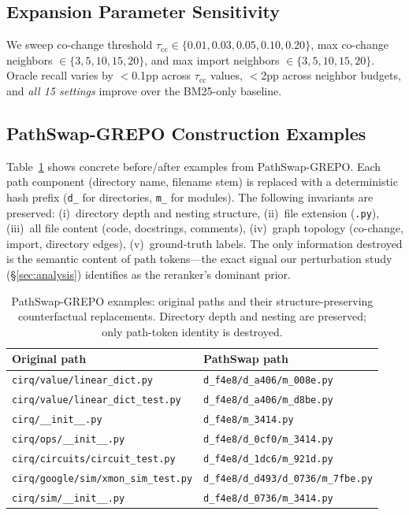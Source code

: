 \documentclass{article}
\begin{document}
\subsection{Expansion Parameter Sensitivity}
\label{app:sensitivity}

We sweep co-change threshold $\tau_\mathrm{cc} \in \{0.01, 0.03, 0.05, 0.10, 0.20\}$, max co-change neighbors $\in \{3, 5, 10, 15, 20\}$, and max import neighbors $\in \{3, 5, 10, 15, 20\}$.
Oracle recall varies by $<$0.1pp across $\tau_\mathrm{cc}$ values, $<$2pp across neighbor budgets, and \emph{all 15 settings} improve over the BM25-only baseline.


\subsection{PathSwap-GREPO Construction Examples}
\label{app:pathswap_examples}

Table~\ref{tab:pathswap_examples} shows concrete before/after examples from PathSwap-GREPO.
Each path component (directory name, filename stem) is replaced with a deterministic hash prefix (\texttt{d\_} for directories, \texttt{m\_} for modules).
The following invariants are preserved: (i)~directory depth and nesting structure, (ii)~file extension (\texttt{.py}), (iii)~all file content (code, docstrings, comments), (iv)~graph topology (co-change, import, directory edges), (v)~ground-truth labels.
The only information destroyed is the semantic content of path tokens---the exact signal our perturbation study (\S\ref{sec:analysis}) identifies as the reranker's dominant prior.

\begin{table}[h]
\centering
\caption{PathSwap-GREPO examples: original paths and their structure-preserving counterfactual replacements. Directory depth and nesting are preserved; only path-token identity is destroyed.}
\label{tab:pathswap_examples}
\small
\begin{tabular}{ll}
\toprule
\textbf{Original path} & \textbf{PathSwap path} \\
\midrule
\texttt{cirq/value/linear\_dict.py} & \texttt{d\_f4e8/d\_a406/m\_008e.py} \\
\texttt{cirq/value/linear\_dict\_test.py} & \texttt{d\_f4e8/d\_a406/m\_d8be.py} \\
\texttt{cirq/\_\_init\_\_.py} & \texttt{d\_f4e8/m\_3414.py} \\
\texttt{cirq/ops/\_\_init\_\_.py} & \texttt{d\_f4e8/d\_0cf0/m\_3414.py} \\
\texttt{cirq/circuits/circuit\_test.py} & \texttt{d\_f4e8/d\_1dc6/m\_921d.py} \\
\texttt{cirq/google/sim/xmon\_sim\_test.py} & \texttt{d\_f4e8/d\_d493/d\_0736/m\_7fbe.py} \\
\texttt{cirq/sim/\_\_init\_\_.py} & \texttt{d\_f4e8/d\_0736/m\_3414.py} \\
\bottomrule
\end{tabular}
\end{table}
\end{document}
